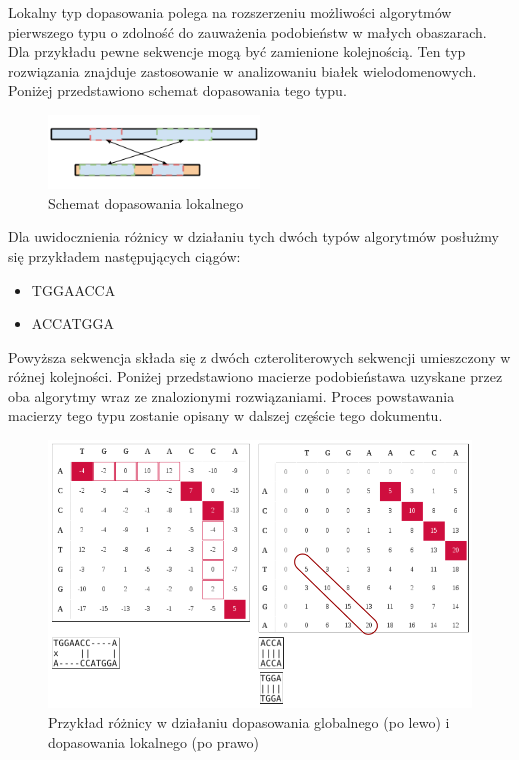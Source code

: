 \documentclass[a4paper,12pt]{article}
\newenvironment{lista}{
\begin{itemize}
  \setlength{\itemsep}{1pt}
  \setlength{\parskip}{0pt}
  \setlength{\parsep}{0pt}
}{\end{itemize}}
\begin{document}
Lokalny typ dopasowania polega na rozszerzeniu możliwości algorytmów pierwszego typu o zdolność do zauważenia podobieństw w małych obaszarach. Dla przykładu pewne sekwencje mogą być zamienione kolejnością. Ten typ rozwiązania znajduje zastosowanie w analizowaniu białek wielodomenowych.  Poniżej przedstawiono schemat dopasowania tego typu. 

\begin{figure}[H]
  \vspace{5pt}
  \centering
  \begin{center}
  \includegraphics[width=0.5\textwidth]{images/Dopasowanie_lokalne.png}
  \end{center}
  \caption{Schemat dopasowania lokalnego}
 \end{figure}
 
 
Dla uwidocznienia różnicy w działaniu tych dwóch typów algorytmów posłużmy się przykładem następujących ciągów:
\begin{lista}
 \item TGGAACCA
\item ACCATGGA
\end{lista}

Powyższa sekwencja składa się z dwóch czteroliterowych sekwencji umieszczony w różnej kolejności. Poniżej przedstawiono macierze podobieństawa uzyskane przez oba algorytmy wraz ze znalozionymi rozwiązaniami. Proces powstawania macierzy tego typu zostanie opisany w dalszej częście tego dokumentu. 


\begin{figure}[H]
  \vspace{5pt}
  \centering
  \begin{center}
  \includegraphics[width=1.0\textwidth]{images/Globalne_lokalne_przyklad.png}
  \end{center}
  \caption{Przykład różnicy w działaniu dopasowania globalnego (po lewo) i dopasowania lokalnego (po prawo)}
 \end{figure}
\end{document}
